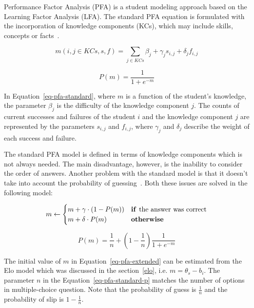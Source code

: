 Performance Factor Analysis (PFA) is a student modeling approach based on the Learning Factor Analysis (LFA). The standard PFA equation is formulated with the incorporation of knowledge components (KCs), which may include skills, concepts or facts~\cite{Pavlik2009}.

\begin{equation} \label{eq-pfa-standard}
  m(i,j \in KCs,s,f) = \sum_{j \in KCs} \beta_j + \gamma_j s_{i,j} + \delta_j f_{i,j} 
\end{equation}

\begin{equation} \label{eq-pfa-standard-p}
  P(m) = \frac{1}{1 + e^{-m}}
\end{equation}

In Equation~\ref{eq-pfa-standard}, where $m$ is a function of the student's knowledge, the parameter $\beta_j$ is the difficulty of the knowledge component $j$. The counts of current successes and failures of the student $i$ and the knowledge component $j$ are represented by the parameters $s_{i,j}$ and $f_{i,j}$, where $\gamma_j$ and $\delta_j$ describe the weight of each success and failure.

The standard PFA model is defined in terms of knowledge components which is not always needed. The main disadvantage, however, is the inability to consider the order of answers. Another problem with the standard model is that it doesn't take into account the probability of guessing~\cite{Papousek2014}. Both these issues are solved in the following model:

\begin{equation} \label{eq-pfa-extended}
  m \gets \begin{cases}
            m + \gamma \cdot (1 - P(m)) & \text{\textbf{if }} \text{the answer was correct} \\
            m + \delta \cdot P(m) & \text{\textbf{otherwise}}
          \end{cases}
\end{equation}

\begin{equation} \label{eq-pfa-standard-p}
  P(m) = \frac{1}{n} + \left(1 - \frac{1}{n}\right)\frac{1}{1 + e^{-m}}
\end{equation}

The initial value of $m$ in Equation~\ref{eq-pfa-extended} can be estimated from the Elo model which was discussed in the section~\ref{elo}, i.e. $m = \theta_s - b_i$. The parameter $n$ in the Equation~\ref{eq-pfa-standard-p} matches the number of options in multiple-choice question. Note that the probability of guess is $\frac{1}{n}$ and the probability of slip is $1 - \frac{1}{n}$.

